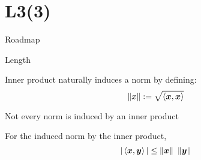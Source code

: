 \documentclass[handout,fleqn,aspectratio=169]{beamer}
\begin{document}
\section{L3(3)}
\begin{frame}{Roadmap}

\plitemsep 0.1in

\bce[(1)] 
\item {}

\item {}

\item {}

\ece
\end{frame}


\begin{frame}{Length}

\plitemsep 0.2in

\bci 

\item Inner product naturally induces a norm by defining:
$$
\left \lVert x \right \rVert := \sqrt{\left\langle \bm{x}, \bm{x} \right\rangle}
$$

\item Not every norm is induced by an inner product

\item {} For the induced norm by the inner product, 
$$
|\inner{\vec{x}}{\vec{y}}| \le \norm{\vec{x}} \ \norm{\vec{y}}
$$

\eci
\end{frame}
\end{document}
